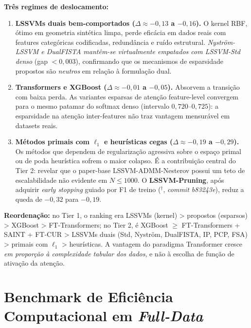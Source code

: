\documentclass[12pt,a4paper]{article}
\begin{document}
\textbf{Três regimes de deslocamento:}
\begin{enumerate}
  \item \textbf{LSSVMs duais bem-comportados ($\Delta \approx -0{,}13$ a $-0{,}16$).}
        O kernel RBF, ótimo em geometria sintética limpa, perde eficácia em
        dados reais com features categóricas codificadas, redundância e ruído
        estrutural. \emph{Nyström-LSSVM e DualFISTA mantêm-se virtualmente
        empatados com LSSVM-Std denso} (gap $< 0{,}003$), confirmando que os
        mecanismos de esparsidade propostos são \emph{neutros} em relação à
        formulação dual.
  \item \textbf{Transformers e XGBoost ($\Delta \approx -0{,}01$ a $-0{,}05$).}
        Absorvem a transição com baixa perda. As variantes esparsas de
        atenção feature-level convergem para o mesmo patamar do softmax denso
        (intervalo $0{,}720$--$0{,}725$): a esparsidade na atenção
        inter-features não traz vantagem mensurável em datasets reais.
  \item \textbf{Métodos primais com $\ell_1$ e heurísticas cegas
        ($\Delta \approx -0{,}19$ a $-0{,}29$).} Os métodos que dependem
        de regularização agressiva sobre o espaço primal ou de poda
        heurística sofrem o maior colapso. É a contribuição central do
        Tier 2: revelar que o paper-base LSSVM-ADMM-Nesterov possui um
        teto de escalabilidade não evidente em $N \leq 1000$. O
        \textbf{LSSVM-Pruning}, após adquirir \emph{early stopping}
        guiado por F1 de treino ($^\dagger$, \emph{commit b83243e}),
        reduz a queda de $-0{,}32$ para $-0{,}19$.
\end{enumerate}

\textbf{Reordenação:} no Tier 1, o ranking era LSSVMs (kernel) > propostos
(esparsos) > XGBoost > FT-Transformers; no Tier 2, é XGBoost $\geq$
FT-Transformers + SAINT + FT-CUR > LSSVMs duais (Std, Nyström, DualFISTA,
IP, PCP, FSA) > primais com $\ell_1$ > heurísticas. A vantagem do paradigma
Transformer cresce \emph{em proporção à complexidade tabular dos dados}, e
não à escolha de função de ativação da atenção.

\section{Benchmark de Eficiência Computacional em \emph{Full-Data}}
\label{sec:benchmark_full_data}
\end{document}
